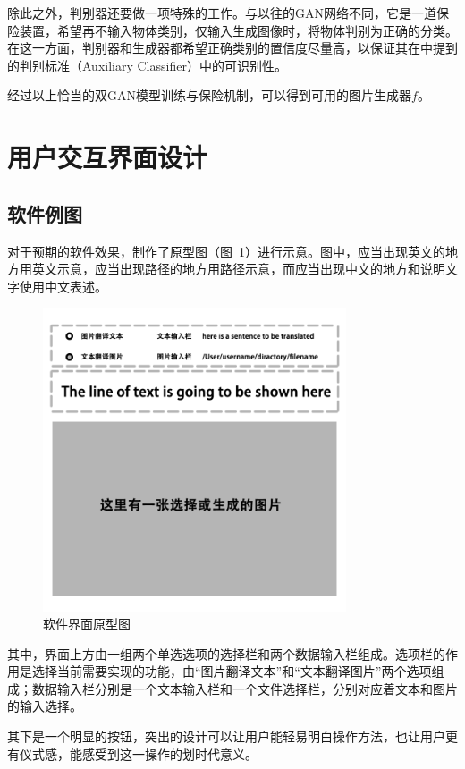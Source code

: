 除此之外，判别器还要做一项特殊的工作。与以往的GAN网络不同，它是一道保险装置，希望再不输入物体类别，仅输入生成图像时，将物体判别为正确的分类。在这一方面，判别器和生成器都希望正确类别的置信度尽量高，以保证其在\cite{odena2017conditional}中提到的判别标准（Auxiliary Classifier）中的可识别性。

经过以上恰当的双GAN模型训练与保险机制，可以得到可用的图片生成器$f$。

\section{用户交互界面设计}
\subsection{软件例图}
对于预期的软件效果，制作了原型图（图~\ref{fig:UIproto}）进行示意。图中，应当出现英文的地方用英文示意，应当出现路径的地方用路径示意，而应当出现中文的地方和说明文字使用中文表述。
\begin{figure}[!htb]
    \centering
    \includegraphics[width=0.8\textwidth]{figures/界面原型图.png}
    \caption{软件界面原型图}
    \label{fig:UIproto}
  \end{figure}

  其中，界面上方由一组两个单选选项的选择栏和两个数据输入栏组成。选项栏的作用是选择当前需要实现的功能，由“图片翻译文本”和“文本翻译图片”两个选项组成；数据输入栏分别是一个文本输入栏和一个文件选择栏，分别对应着文本和图片的输入选择。

  其下是一个明显的按钮，突出的设计可以让用户能轻易明白操作方法，也让用户更有仪式感，能感受到这一操作的划时代意义。

